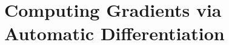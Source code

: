 \documentclass[../../book-main.tex]{subfiles}
\begin{document}




\section{Computing Gradients via Automatic Differentiation}\label{sec:autodiff}
\end{document}
